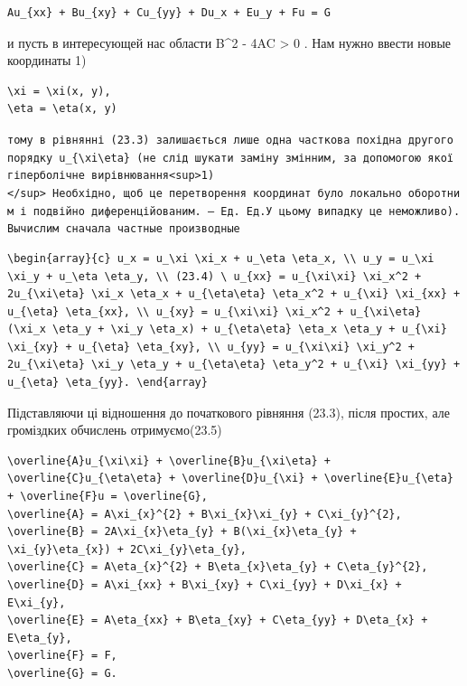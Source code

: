 \documentclass[
  ukrainian,
]{article}
\begin{document}
\begin{verbatim}
Au_{xx} + Bu_{xy} + Cu_{yy} + Du_x + Eu_y + Fu = G
\end{verbatim}

и пусть в интересующей нас области B\^{}2 - 4AC \textgreater{} 0 . Нам
нужно ввести новые координаты 1)

\begin{verbatim}
\xi = \xi(x, y),
\eta = \eta(x, y)
\end{verbatim}

\texttt{тому\ в\ рівнянні\ (23.3)\ залишається\ лише\ одна\ часткова\ похідна\ другого\ порядку\ \textquotesingle{}u\_\{\textbackslash{}xi\textbackslash{}eta\}\textquotesingle{}\ (не\ слід\ шукати\ заміну\ змінним,\ за\ допомогою\ якої\ гіперболічне\ вирівнювання\textless{}sup\textgreater{}1)\textless{}/sup\textgreater{}\ Необхідно,\ щоб\ це\ перетворення\ координат\ було\ локально\ оборотним\ і\ подвійно\ диференційованим.\ —\ Ед.\ Ед.У\ цьому\ випадку\ це\ неможливо).Вычислим\ сначала\ частные\ производные}

\begin{verbatim}
\begin{array}{c} u_x = u_\xi \xi_x + u_\eta \eta_x, \\ u_y = u_\xi \xi_y + u_\eta \eta_y, \\ (23.4) \ u_{xx} = u_{\xi\xi} \xi_x^2 + 2u_{\xi\eta} \xi_x \eta_x + u_{\eta\eta} \eta_x^2 + u_{\xi} \xi_{xx} + u_{\eta} \eta_{xx}, \\ u_{xy} = u_{\xi\xi} \xi_x^2 + u_{\xi\eta} (\xi_x \eta_y + \xi_y \eta_x) + u_{\eta\eta} \eta_x \eta_y + u_{\xi} \xi_{xy} + u_{\eta} \eta_{xy}, \\ u_{yy} = u_{\xi\xi} \xi_y^2 + 2u_{\xi\eta} \xi_y \eta_y + u_{\eta\eta} \eta_y^2 + u_{\xi} \xi_{yy} + u_{\eta} \eta_{yy}. \end{array}
\end{verbatim}

Підставляючи ці відношення до початкового рівняння (23.3), після
простих, але громіздких обчислень отримуємо(23.5)

\begin{verbatim}
\overline{A}u_{\xi\xi} + \overline{B}u_{\xi\eta} + \overline{C}u_{\eta\eta} + \overline{D}u_{\xi} + \overline{E}u_{\eta} + \overline{F}u = \overline{G},
\overline{A} = A\xi_{x}^{2} + B\xi_{x}\xi_{y} + C\xi_{y}^{2},
\overline{B} = 2A\xi_{x}\eta_{y} + B(\xi_{x}\eta_{y} + \xi_{y}\eta_{x}) + 2C\xi_{y}\eta_{y},
\overline{C} = A\eta_{x}^{2} + B\eta_{x}\eta_{y} + C\eta_{y}^{2},
\overline{D} = A\xi_{xx} + B\xi_{xy} + C\xi_{yy} + D\xi_{x} + E\xi_{y},
\overline{E} = A\eta_{xx} + B\eta_{xy} + C\eta_{yy} + D\eta_{x} + E\eta_{y},
\overline{F} = F,
\overline{G} = G.
\end{verbatim}
\end{document}
